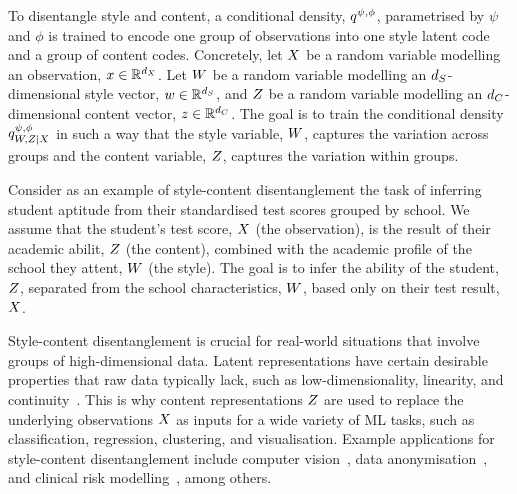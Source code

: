 \documentclass[../thesis.tex]{subfiles}
\begin{document}
To disentangle style and content, a conditional density, $q^{\psi, \phi}$, parametrised by $\psi$ and $\phi$ is trained to encode one group of observations into one style latent code and a group of content codes. Concretely, let $\myrv{x}$ be a random variable modelling an observation, $\myvect{x} \in \mathbb{R}^{\mydim{x}}$. Let $\myrv{w}$ be a random variable modelling an $\mydim{s}$-dimensional style vector, $\myvect{w} \in \mathbb{R}^{\mydim{s}}$, and $\myrv{z}$ be a random variable modelling an $\mydim{c}$-dimensional content vector, $\myvect{z} \in \mathbb{R}^{\mydim{c}}$. The goal is to train the conditional density $\myfunc{q}^{\psi, \phi}_{\myrv{w}, \myrv{z} | \myrv{x}}$ in such a way that the style variable, $\myrv{w}$, captures the variation across groups and the content variable, $\myrv{z}$, captures the variation within groups. 

Consider as an example of style-content disentanglement the task of inferring student aptitude from their standardised test scores grouped by school. We assume that the student's test score, $\myrv{x}$ (the observation), is the result of their academic abilit, $\myrv{z}$ (the content), combined with the academic profile of the school they attent, $\myrv{w}$ (the style). The goal is to infer the ability of the student, $\myrv{z}$, separated from the school characteristics, $\myrv{w}$, based only on their test result, $\myrv{x}$.


Style-content disentanglement is crucial for real-world situations that involve groups of high-dimensional data. Latent representations have certain desirable properties that raw data typically lack, such as low-dimensionality, linearity, and continuity~\citep{bengioRepresentationLearningReview2014}. This is why content representations $\myrv{z}$ are used to replace the underlying observations $\myrv{x}$ as inputs for a wide variety of ML tasks, such as classification, regression, clustering, and visualisation. Example applications for style-content disentanglement include computer vision~\citep{tenenbaum2000separating}, data anonymisation~\citep{louizos2016variational}, and clinical risk modelling~\citep{pavlouHowDevelopMore2015}, among others.
\end{document}
